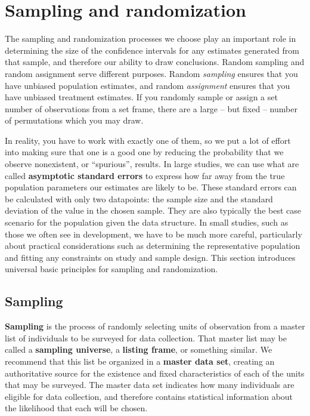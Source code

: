 
\section{Sampling and randomization}

The sampling and randomization processes we choose
play an important role in determining the size of the confidence intervals
for any estimates generated from that sample,
and therefore our ability to draw conclusions.
Random sampling and random assignment serve different purposes.
Random \textit{sampling} ensures that you have unbiased population estimates,
and random \textit{assignment} ensures that you have unbiased treatment estimates.
If you randomly sample or assign a set number of observations from a set frame,
there are a large -- but fixed -- number of permutations which you may draw.

In reality, you have to work with exactly one of them,
so we put a lot of effort into making sure that one is a good one
by reducing the probability that we observe nonexistent, or ``spurious'', results.
In large studies, we can use what are called \textbf{asymptotic standard errors}\cite{88491}
to express how far away from the true population parameters our estimates are likely to be.
These standard errors can be calculated with only two datapoints:
the sample size and the standard deviation of the value in the chosen sample.
They are also typically the best case scenario for the population given the data structure.
In small studies, such as those we often see in development,
we have to be much more careful, particularly about practical considerations
such as determining the representative population
and fitting any constraints on study and sample design.
This section introduces universal basic principles for sampling and randomization.

\subsection{Sampling}

\textbf{Sampling} is the process of randomly selecting units of observation
from a master list of individuals to be surveyed for data collection.
That master list may be called a \textbf{sampling universe}, a \textbf{listing frame}, or something similar.
We recommend that this list be organized in a \textbf{master data set},
creating an authoritative source for the existence and fixed
characteristics of each of the units that may be surveyed.
The master data set indicates how many individuals are eligible for data collection,
and therefore contains statistical information about the likelihood that each will be chosen.

